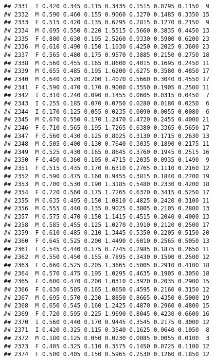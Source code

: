 \documentclass[
]{article}
\begin{document}
\begin{verbatim}
## 2331  I 0.420 0.345 0.115 0.3435 0.1515 0.0795 0.1150  9
## 2332  M 0.590 0.460 0.155 0.9060 0.3270 0.1485 0.3350 15
## 2333  F 0.515 0.420 0.135 0.6295 0.2815 0.1270 0.2150  9
## 2334  M 0.695 0.550 0.220 1.5515 0.5660 0.3835 0.4450 13
## 2335  F 0.800 0.630 0.195 2.5260 0.9330 0.5900 0.6200 23
## 2336  M 0.610 0.490 0.150 1.1030 0.4250 0.2025 0.3600 23
## 2337  F 0.565 0.480 0.175 0.9570 0.3885 0.2150 0.2750 18
## 2338  M 0.560 0.455 0.165 0.8600 0.4015 0.1695 0.2450 11
## 2339  M 0.655 0.485 0.195 1.6200 0.6275 0.3580 0.4850 17
## 2340  M 0.640 0.520 0.200 1.4070 0.5660 0.3040 0.4550 17
## 2341  F 0.590 0.470 0.170 0.9000 0.3550 0.1905 0.2500 11
## 2342  I 0.310 0.240 0.090 0.1455 0.0605 0.0315 0.0450  7
## 2343  I 0.255 0.185 0.070 0.0750 0.0280 0.0180 0.0250  6
## 2344  I 0.170 0.125 0.055 0.0235 0.0090 0.0055 0.0080  6
## 2345  M 0.670 0.550 0.170 1.2470 0.4720 0.2455 0.4000 21
## 2346  F 0.710 0.565 0.195 1.7265 0.6380 0.3365 0.5650 17
## 2347  F 0.560 0.430 0.125 0.8025 0.3130 0.1715 0.2630 13
## 2348  M 0.505 0.400 0.130 0.7640 0.3035 0.1890 0.2175 11
## 2349  M 0.525 0.430 0.165 0.8645 0.3760 0.1945 0.2515 16
## 2350  F 0.450 0.360 0.105 0.4715 0.2035 0.0935 0.1490  9
## 2351  F 0.515 0.435 0.170 0.6310 0.2765 0.1110 0.2160 12
## 2352  M 0.590 0.475 0.160 0.9455 0.3815 0.1840 0.2700 19
## 2353  M 0.700 0.530 0.190 1.3185 0.5480 0.2330 0.4200 18
## 2354  F 0.720 0.560 0.175 1.7265 0.6370 0.3415 0.5250 17
## 2355  M 0.635 0.495 0.150 1.0810 0.4825 0.2420 0.3100 11
## 2356  M 0.555 0.440 0.135 0.9025 0.3805 0.2105 0.2800 13
## 2357  M 0.575 0.470 0.150 1.1415 0.4515 0.2040 0.4000 13
## 2358  M 0.585 0.455 0.125 1.0270 0.3910 0.2120 0.2500 17
## 2359  F 0.610 0.485 0.210 1.3445 0.5350 0.2205 0.5150 20
## 2360  F 0.645 0.525 0.200 1.4490 0.6010 0.2565 0.5050 13
## 2361  F 0.545 0.440 0.175 0.7745 0.2985 0.1875 0.2650 11
## 2362  M 0.550 0.450 0.155 0.7895 0.3430 0.1590 0.2500 12
## 2363  F 0.660 0.525 0.205 1.3665 0.5005 0.2910 0.4100 18
## 2364  M 0.570 0.475 0.195 1.0295 0.4635 0.1905 0.3050 18
## 2365  F 0.600 0.470 0.200 1.0310 0.3920 0.2035 0.2900 15
## 2366  F 0.630 0.505 0.165 1.0650 0.4595 0.2160 0.3150 12
## 2367  M 0.695 0.570 0.230 1.8850 0.8665 0.4350 0.5000 19
## 2368  M 0.650 0.545 0.160 1.2425 0.4870 0.2960 0.4800 15
## 2369  F 0.720 0.595 0.225 1.9690 0.8045 0.4230 0.6600 16
## 2370  I 0.560 0.440 0.170 0.9445 0.3545 0.2175 0.3000 12
## 2371  I 0.420 0.325 0.115 0.3540 0.1625 0.0640 0.1050  8
## 2372  M 0.180 0.125 0.050 0.0230 0.0085 0.0055 0.0100  3
## 2373  F 0.405 0.325 0.110 0.3575 0.1450 0.0725 0.1100 12
## 2374  F 0.500 0.405 0.150 0.5965 0.2530 0.1260 0.1850 12

\end{verbatim}
\end{document}
